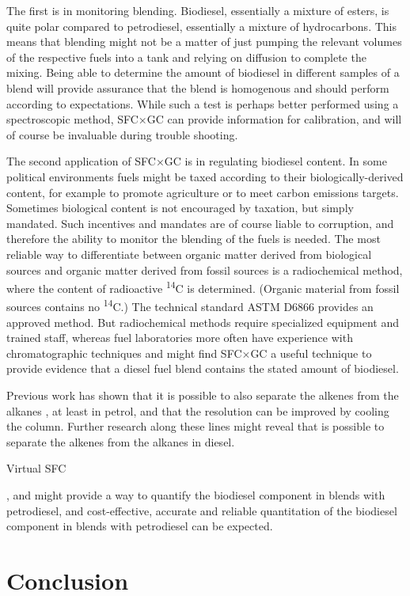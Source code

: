 The first is in monitoring blending. Biodiesel, essentially a mixture of esters,
is quite polar compared to petrodiesel, essentially a mixture of hydrocarbons.
This means that blending might not be a matter of just pumping the relevant volumes
of the respective fuels into a tank and relying on diffusion to complete the
mixing. Being able to determine the amount of biodiesel in different samples of
a blend will provide assurance that the blend is homogenous and should perform
according to expectations. While such a test is perhaps better performed using a
spectroscopic method, SFC×GC can provide information for calibration, and will
of course be invaluable during trouble shooting.  

The second application of SFC×GC is in regulating biodiesel content. In some
political environments fuels might be taxed according to their
biologically-derived content, for example to promote agriculture or to meet
carbon emissions targets. Sometimes biological content is not encouraged by
taxation, but simply mandated. Such incentives and mandates are of course liable
to corruption, and therefore the ability to monitor the blending of the fuels is
needed. The most reliable way to differentiate between organic matter derived
from biological sources and organic matter derived from fossil sources is a
radiochemical method, where the content of radioactive \textsuperscript{14}C is
determined. (Organic material from fossil sources contains no
\textsuperscript{14}C.) The technical standard ASTM D6866 provides an approved
method. But radiochemical methods require specialized equipment and trained
staff, whereas fuel laboratories more often have experience with chromatographic
techniques and might find SFC×GC a useful technique to provide evidence that a
diesel fuel blend contains the stated amount of biodiesel.

\begin{todo}

Previous work has shown that it is possible to also separate the alkenes from
the alkanes \autocite{Venter1999}, at least in petrol, and that the resolution
can be improved by cooling the column. Further research along these lines might
reveal that is possible to separate the alkenes from the alkanes in diesel. 

\end{todo}


\begin{todo}Virtual SFC\end{todo}

, and might provide a way to quantify the biodiesel component in blends
with petrodiesel, and cost-effective, accurate and reliable quantitation of the
biodiesel component in blends with petrodiesel can be expected.


\section{Conclusion}

\todos
